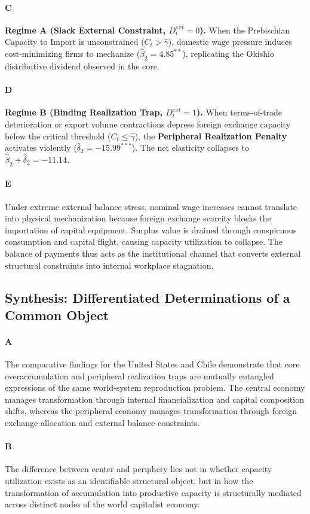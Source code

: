 \paragraph{C}
\textbf{Regime A (Slack External Constraint, $D^{ext}_t = 0$).} When the Prebischian Capacity to Import is unconstrained ($C_t > \hat{\gamma}$), domestic wage pressure induces cost-minimizing firms to mechanize ($\hat{\beta}_2 = 4.85^{**}$), replicating the Okishio distributive dividend observed in the core.

\paragraph{D}
\textbf{Regime B (Binding Realization Trap, $D^{ext}_t = 1$).} When terms-of-trade deterioration or export volume contractions depress foreign exchange capacity below the critical threshold ($C_t \le \hat{\gamma}$), the \textbf{Peripheral Realization Penalty} activates violently ($\hat{\delta}_2 = -15.99^{***}$). The net elasticity collapses to $\hat{\beta}_2 + \hat{\delta}_2 = -11.14$.

\paragraph{E}
Under extreme external balance stress, nominal wage increases cannot translate into physical mechanization because foreign exchange scarcity blocks the importation of capital equipment. Surplus value is drained through conspicuous consumption and capital flight, causing capacity utilization to collapse. The balance of payments thus acts as the institutional channel that converts external structural constraints into internal workplace stagnation.

\subsection{Synthesis: Differentiated Determinations of a Common Object}

\paragraph{A}
The comparative findings for the United States and Chile demonstrate that core overaccumulation and peripheral realization traps are mutually entangled expressions of the same world-system reproduction problem. The central economy manages transformation through internal financialization and capital composition shifts, whereas the peripheral economy manages transformation through foreign exchange allocation and external balance constraints.

\paragraph{B}
The difference between center and periphery lies not in whether capacity utilization exists as an identifiable structural object, but in how the transformation of accumulation into productive capacity is structurally mediated across distinct nodes of the world capitalist economy.